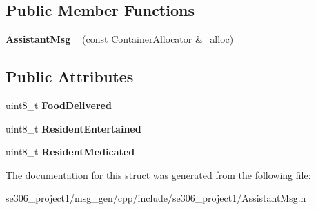\subsection*{Public Member Functions}
\begin{DoxyCompactItemize}
\item 
\hypertarget{structse306__project1_1_1AssistantMsg___af325d6761ff1fe9faf15d9191ecf30a9}{{\bfseries Assistant\-Msg\-\_\-} (const Container\-Allocator \&\-\_\-alloc)}\label{structse306__project1_1_1AssistantMsg___af325d6761ff1fe9faf15d9191ecf30a9}

\end{DoxyCompactItemize}
\subsection*{Public Attributes}
\begin{DoxyCompactItemize}
\item 
\hypertarget{structse306__project1_1_1AssistantMsg___a2b813e67b1a15844e7707af9d314e391}{uint8\-\_\-t {\bfseries Food\-Delivered}}\label{structse306__project1_1_1AssistantMsg___a2b813e67b1a15844e7707af9d314e391}

\item 
\hypertarget{structse306__project1_1_1AssistantMsg___a21e629bd299be80c161fd25d4858ed60}{uint8\-\_\-t {\bfseries Resident\-Entertained}}\label{structse306__project1_1_1AssistantMsg___a21e629bd299be80c161fd25d4858ed60}

\item 
\hypertarget{structse306__project1_1_1AssistantMsg___a851841f125317e55796d384c69b9b34f}{uint8\-\_\-t {\bfseries Resident\-Medicated}}\label{structse306__project1_1_1AssistantMsg___a851841f125317e55796d384c69b9b34f}

\end{DoxyCompactItemize}


The documentation for this struct was generated from the following file\-:\begin{DoxyCompactItemize}
\item 
se306\-\_\-project1/msg\-\_\-gen/cpp/include/se306\-\_\-project1/Assistant\-Msg.\-h\end{DoxyCompactItemize}
